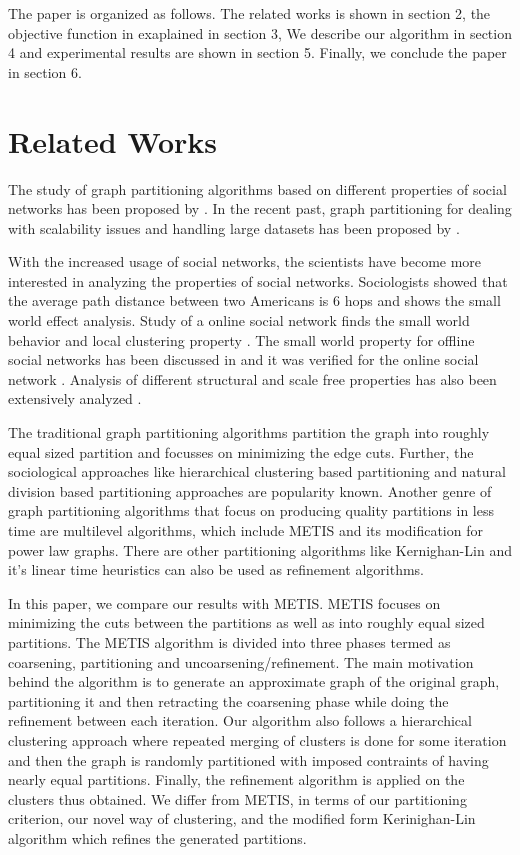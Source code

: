 \documentclass[letterpaper]{article}
\begin{document}
The paper is organized as follows. The related works is shown in section 2, the
objective function in exaplained in section 3, We describe our algorithm  in
section 4 and  experimental results are shown in section 5.  Finally, we
conclude the paper in section 6.

\section{Related Works}
  The study of graph partitioning algorithms based on different properties of
social networks has been proposed by \cite{arxviv}. In the recent past, graph
partitioning for dealing with scalability issues and handling large datasets
has been proposed by \cite{5,6}.

    With the increased usage of social networks, the scientists have become
more interested in analyzing the properties of social networks.  Sociologists
showed that the average path distance between two Americans is 6 hops \cite{4}
and \cite{8} shows the small world effect analysis.  Study of a online social
network  finds the small world behavior and local clustering property
\cite{9}.  The small world property for offline social networks has been
discussed in \cite{9,10,11} and it was verified for the online social network
\cite{12,13}. Analysis of different structural and scale free properties has
also been extensively analyzed \cite{12}.



    The traditional graph partitioning algorithms\cite{16,17,18} partition the
graph into roughly equal sized partition  and focusses on minimizing the edge
cuts.  Further, the sociological approaches like hierarchical clustering based
partitioning and natural division based partitioning approaches are popularity
known\cite{19}. Another genre of graph partitioning algorithms that focus on
producing quality partitions in less time are multilevel algorithms, which
include METIS\cite{20} and its modification for power law graphs\cite{21}.
There are other partitioning algorithms like Kernighan-Lin\cite{22} and it's
linear time heuristics\cite{23} can also be used as refinement algorithms.


    In this paper, we  compare our results with METIS\cite{20}. METIS focuses
on minimizing the cuts between the partitions as well as into roughly equal sized
partitions. The METIS algorithm is divided into three phases termed as
coarsening, partitioning and uncoarsening/refinement.  The main motivation
behind the algorithm is to generate an approximate graph of the original graph,
partitioning it and then retracting the coarsening phase while doing the
refinement between each iteration.  Our algorithm also follows a hierarchical
clustering approach where repeated merging of clusters is done for some
iteration and then the graph is randomly partitioned with imposed contraints of
having nearly equal partitions. Finally, the refinement algorithm is applied on
the clusters thus obtained. We differ from METIS, in terms of our partitioning
criterion, our novel way of clustering, and  the modified form Kerinighan-Lin 
algorithm which  refines the generated partitions.
\end{document}
